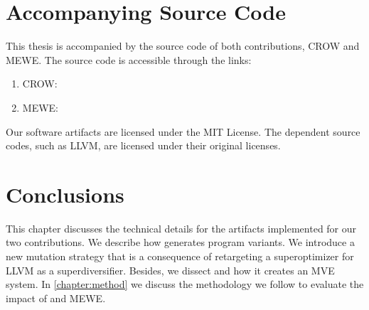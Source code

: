 


\section*{Accompanying Source Code}

This thesis is accompanied by the source code of both contributions, CROW and MEWE. The source code is accessible through the links:
\begin{enumerate}
    \item CROW: 
    \item MEWE: 
\end{enumerate}

Our software artifacts are licensed under the MIT License. The dependent source codes, such as LLVM, are licensed under their original licenses.

\section*{Conclusions}

This chapter discusses the technical details for the artifacts implemented for our two contributions.
We describe how generates program variants.
We introduce a new mutation strategy that is a consequence of retargeting a superoptimizer for LLVM as a superdiversifier.
Besides, we dissect and how it creates an MVE system.
In \autoref{chapter:method} we discuss the methodology we follow to evaluate the impact of and MEWE.